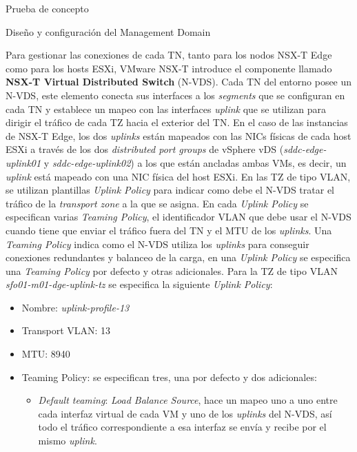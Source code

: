 \begin{section}{Prueba de concepto}
\begin{subsection}{Diseño y configuración del Management Domain}
    
    Para gestionar las conexiones de cada TN, tanto para los nodos NSX-T Edge como para los hosts ESXi, VMware NSX-T introduce el componente llamado \textbf{NSX-T Virtual Distributed Switch} (N-VDS). Cada TN del entorno posee un N-VDS, este elemento conecta sus interfaces a los \textit{segments} que se configuran en cada TN y establece un mapeo con las interfaces \textit{uplink} que se utilizan para dirigir el tráfico de cada TZ hacia el exterior del TN. En el caso de las instancias de NSX-T Edge, los dos \textit{uplinks} están mapeados con las NICs físicas de cada host ESXi a través de los dos \textit{distributed port groups} de vSphere vDS (\textit{sddc-edge-uplink01} y \textit{sddc-edge-uplink02}) a los que están ancladas ambas VMs, es decir, un \textit{uplink} está mapeado con una NIC física del host ESXi. 
    En las TZ de tipo VLAN, se utilizan plantillas \textit{Uplink Policy} para indicar como debe el N-VDS tratar el tráfico de la \textit{transport zone} a la que se asigna. En cada \textit{Uplink Policy} se especifican varias \textit{Teaming Policy}, el identificador VLAN que debe usar el N-VDS cuando tiene que enviar el tráfico fuera del TN y el MTU de los \textit{uplinks}. Una \textit{Teaming Policy} indica como el N-VDS utiliza los \textit{uplinks} para conseguir conexiones redundantes y balanceo de la carga, en una \textit{Uplink Policy} se especifica una \textit{Teaming Policy} por defecto y otras adicionales.
    Para la TZ de tipo VLAN \textit{sfo01-m01-dge-uplink-tz} se especifica la siguiente \textit{Uplink Policy}:
    \begin{itemize}
      \item Nombre: \textit{uplink-profile-13}
      \item Transport VLAN: 13
      \item MTU: 8940
      \item Teaming Policy: se especifican tres, una por defecto y dos adicionales:
        \begin{itemize}
          \item \textit{Default teaming}: \textit{Load Balance Source}, hace un mapeo uno a uno entre cada interfaz virtual de cada VM y uno de los \textit{uplinks} del N-VDS, así todo el tráfico correspondiente a esa interfaz se envía y recibe por el mismo \textit{uplink}.
          

\end{itemize}
\end{itemize}
\end{subsection}
\end{section}
